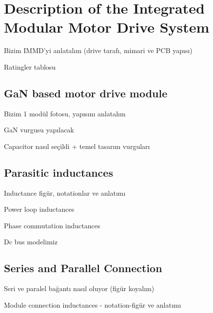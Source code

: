 
\section{Description of the Integrated Modular Motor Drive System}

Bizim IMMD'yi anlatalım (drive tarafı, mimari ve PCB yapısı)

Ratingler tablosu

\subsection{GaN based motor drive module}

Bizim 1 modül fotosu, yapısını anlatalım

GaN vurgusu yapılacak

Capacitor nasıl seçildi + temel tasarım vurguları

\subsection{Parasitic inductances}

Inductance figür, notationlar ve anlatımı

Power loop inductances

Phase commutation inductances

Dc bus modelimiz

\subsection{Series and Parallel Connection}

Seri ve paralel bağantı nasıl oluyor (figür koyalım)

Module connection inductances - notation-figür ve anlatımı

